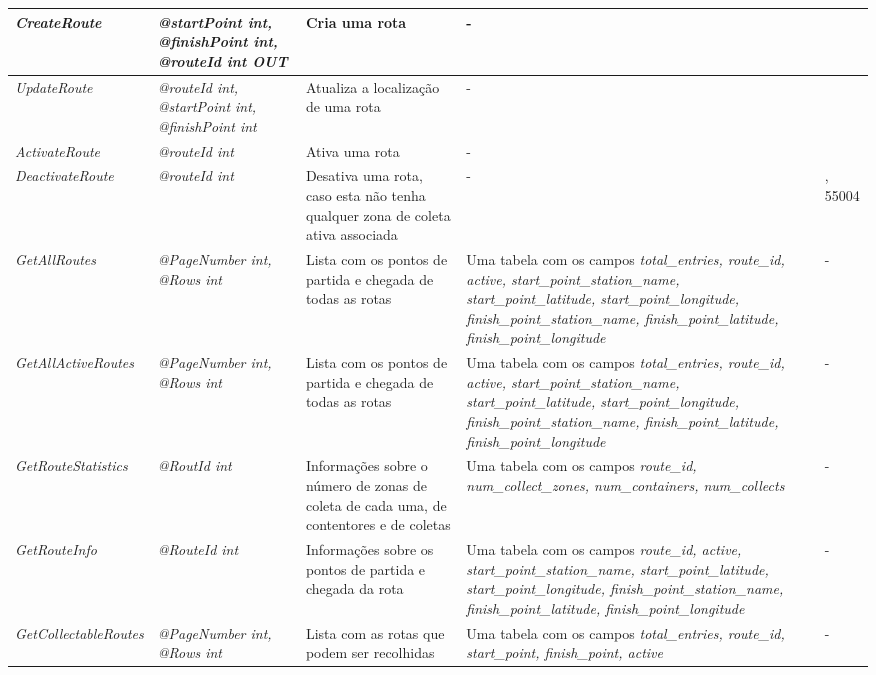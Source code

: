 \begin{longtable}{|>{\RaggedRight\arraybackslash}p{5cm}|>{\RaggedRight\arraybackslash}p{5cm}|>{\RaggedRight\arraybackslash}p{5cm}|>{\RaggedRight\arraybackslash}p{5cm}|>{\RaggedRight\arraybackslash}p{5cm}|}
	\textit{CreateRoute} & \textit{@startPoint int, @finishPoint int, @routeId int OUT} & Cria uma rota & - & 55001 \\ \hline
	\textit{UpdateRoute} & \textit{@routeId int, @startPoint int, @finishPoint int} & Atualiza a localização de uma rota & - & 55001 \\ \hline
	\textit{ActivateRoute} & \textit{@routeId int} & Ativa uma rota & - & 55003 \\ \hline
	\textit{DeactivateRoute} & \textit{@routeId int} & Desativa uma rota, caso esta não tenha qualquer zona de coleta ativa associada & - & 55003, 55004 \\ \hline
	\textit{GetAllRoutes} & \textit{@PageNumber int, @Rows int} & Lista com os pontos de partida e chegada de todas as rotas & Uma tabela com os campos \textit{total\_entries, route\_id, active, start\_point\_station\_name, start\_point\_latitude, start\_point\_longitude, finish\_point\_station\_name, finish\_point\_latitude, finish\_point\_longitude} & - \\ \hline
	\textit{GetAllActiveRoutes} & \textit{@PageNumber int, @Rows int} & Lista com os pontos de partida e chegada de todas as rotas & Uma tabela com os campos \textit{total\_entries, route\_id, active, start\_point\_station\_name, start\_point\_latitude, start\_point\_longitude, finish\_point\_station\_name, finish\_point\_latitude, finish\_point\_longitude} & - \\ \hline
	\textit{GetRouteStatistics} & \textit{@RoutId int} & Informações sobre o número de zonas de coleta de cada uma, de contentores e de coletas & Uma tabela com os campos \textit{route\_id, num\_collect\_zones, num\_containers, num\_collects} & - \\ \hline
	\textit{GetRouteInfo} & \textit{@RouteId int} & Informações sobre os pontos de partida e chegada da rota & Uma tabela com os campos \textit{route\_id, active, start\_point\_station\_name, start\_point\_latitude, start\_point\_longitude, finish\_point\_station\_name, finish\_point\_latitude, finish\_point\_longitude} & - \\ \hline
	\textit{GetCollectableRoutes} & \textit{@PageNumber int, @Rows int} & Lista com as rotas que podem ser recolhidas & Uma tabela com os campos \textit{total\_entries, route\_id, start\_point, finish\_point, active} & - \\ \hline
\end{longtable}

